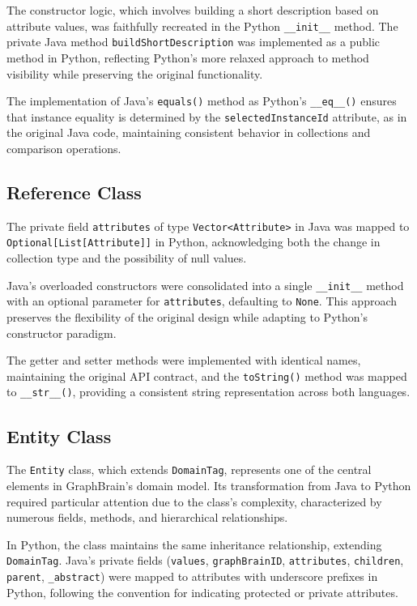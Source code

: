 \documentclass[12pt,a4paper]{article}
\begin{document}
The constructor logic, which involves building a short description based on attribute values, was faithfully recreated in the Python \texttt{\_\_init\_\_} method. The private Java method \texttt{buildShortDescription} was implemented as a public method in Python, reflecting Python's more relaxed approach to method visibility while preserving the original functionality.

The implementation of Java's \texttt{equals()} method as Python's \texttt{\_\_eq\_\_()} ensures that instance equality is determined by the \texttt{selectedInstanceId} attribute, as in the original Java code, maintaining consistent behavior in collections and comparison operations.

\subsection{Reference Class}
 The private field \texttt{attributes} of type \texttt{Vector<Attribute>} in Java was mapped to \texttt{Optional[List[Attribute]]} in Python, acknowledging both the change in collection type and the possibility of null values.

Java's overloaded constructors were consolidated into a single \texttt{\_\_init\_\_} method with an optional parameter for \texttt{attributes}, defaulting to \texttt{None}. This approach preserves the flexibility of the original design while adapting to Python's constructor paradigm.

The getter and setter methods were implemented with identical names, maintaining the original API contract, and the \texttt{toString()} method was mapped to \texttt{\_\_str\_\_()}, providing a consistent string representation across both languages.

\subsection{Entity Class}

The \texttt{Entity} class, which extends \texttt{DomainTag}, represents one of the central elements in GraphBrain's domain model. Its transformation from Java to Python required particular attention due to the class's complexity, characterized by numerous fields, methods, and hierarchical relationships.

In Python, the class maintains the same inheritance relationship, extending \texttt{DomainTag}. Java's private fields (\texttt{values}, \texttt{graphBrainID}, \texttt{attributes}, \texttt{children}, \texttt{parent}, \texttt{\_abstract}) were mapped to attributes with underscore prefixes in Python, following the convention for indicating protected or private attributes.
\end{document}
